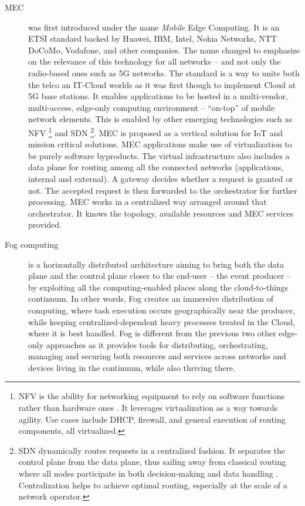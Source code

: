 \documentclass[11pt]{sdm}
\begin{document}
\begin{description}
	\item[\acrfull{MEC}] was first introduced under the name \emph{Mobile} Edge Computing. It is an \gls{ETSI} standard backed by Huawei, IBM, Intel, Nokia Networks, NTT DoCoMo, Vodafone, and other companies. The name changed to emphasize on the relevance of this technology for all networks -- and not only the radio-based ones such as 5G networks. The standard is a way to unite both the telco an IT-Cloud worlds \cite{dahmen-lhuissier_etsi_nodate-1} as it was first though to implement Cloud at 5G base stations. It enables applications to be hosted in a multi-vendor, multi-access, edge-only computing environment -- ``on-top'' of mobile network elements. This is enabled by other emerging technologies such as \gls{NFV} \footnote{\acrfull{NFV} is the ability for networking equipment to rely on software functions rather than hardware ones \cite{redhat_what_2019}. It leverages virtualization as a way towards agility. Use cases include DHCP, firewall, and general execution of routing components, all virtualized.} and \gls{SDN} \footnote{\acrfull{SDN} dynamically routes requests in a centralized fashion. It separates the control plane from the data plane, thus sailing away from classical routing where all nodes participate in both decision-making and data handling \cite{redhat_what_2019}. Centralization helps to achieve optimal routing, especially at the scale of a network operator.}. \gls{MEC} is proposed as a vertical solution for \gls{IoT} and mission critical solutions. \gls{MEC} applications make use of virtualization to be purely software byproducts. The virtual infrastructure also includes a data plane for routing among all the connected networks (applications, internal and external). A gateway decides whether a request is granted or not. The accepted request is then forwarded to the orchestrator for further processing. \gls{MEC} works in a centralized way arranged around that orchestrator. It knows the topology, available resources and \gls{MEC} services provided.
	
	\item[Fog computing] is a horizontally distributed architecture aiming to bring both the data plane and the control plane closer to the end-user -- the event producer -- by exploiting all the computing-enabled places along the cloud-to-things continuum. In other words, Fog creates an immersive distribution of computing, where task execution occurs geographically near the producer, while keeping centralized-dependent heavy processes treated in the Cloud, where it is best handled. Fog is different from the previous two other edge-only approaches as it provides tools for distributing, orchestrating, managing and securing both resources and services across networks and devices living in the continuum, while also thriving there.
	

\end{description}
\end{document}
